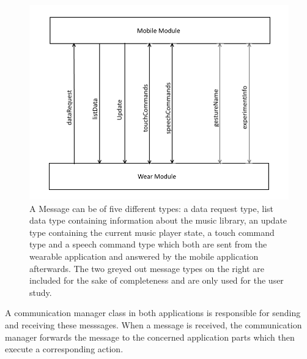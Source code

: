 \begin{figure}[bth]
	\myfloatalign
	\includegraphics[width=1\linewidth]{img/CommunicationOverview.png}
	\caption{A Message can be of five different types: a data request type, list data type containing information about the music library, an update type containing the current music player state, a touch command type and a speech command type which both are sent from the wearable application and answered by the mobile application afterwards. The two greyed out message types on the right are included for the sake of completeness and are only used for the user study.}
	\label{fig:communicationoverview}
\end{figure}

A communication manager class in both applications is responsible for sending and receiving these messsages. When a message is received, the communication manager forwards the message to the  concerned application parts which then execute a corresponding action.


